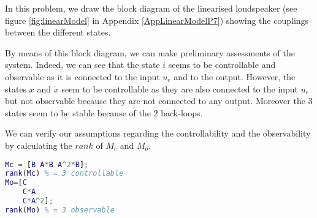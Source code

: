 In this problem, we draw the block diagram of the linearised loudspeaker (see figure \ref{fig:linearModel} in Appendix \ref{AppLinearModelP7}) showing the couplings between the different states.

By means of this block diagram, we can make preliminary assessments of the system. Indeed, we can see that the state $i$ seems to be controllable and observable as it is connected to the input $u_e$ and to the output. However, the states $x$ and $\dot{x}$ seem to be controllable as they are also connected to the input $u_e$ but not observable because they are not connected to any output. Moreover the 3 states seem to be stable because of the 2 back-loops.

We can verify our assumptions regarding the controllability and the observability by calculating the $rank$ of $M_c$ and $M_o$.
\begin{lstlisting}[language=Matlab]
Mc = [B A*B A^2*B];
rank(Mc) % = 3 controllable
Mo=[C
    C*A
    C*A^2];
rank(Mo) % = 3 observable
\end{lstlisting}


